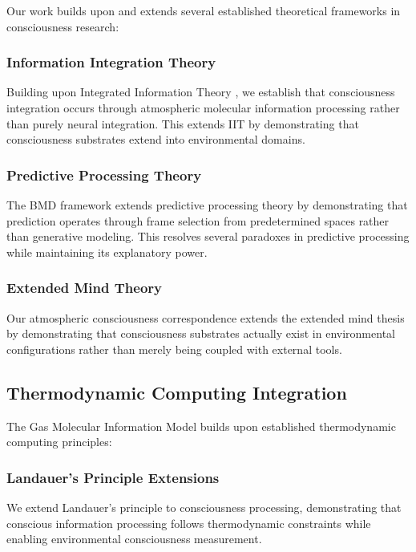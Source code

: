 \documentclass[12pt,a4paper]{article}
\begin{document}
Our work builds upon and extends several established theoretical frameworks in consciousness research:

\subsubsection{Information Integration Theory}

Building upon Integrated Information Theory \citep{tononi2008consciousness}, we establish that consciousness integration occurs through atmospheric molecular information processing rather than purely neural integration. This extends IIT by demonstrating that consciousness substrates extend into environmental domains.

\subsubsection{Predictive Processing Theory}

The BMD framework extends predictive processing theory \citep{clark2013whatever, hohwy2013predictive} by demonstrating that prediction operates through frame selection from predetermined spaces rather than generative modeling. This resolves several paradoxes in predictive processing while maintaining its explanatory power.

\subsubsection{Extended Mind Theory}

Our atmospheric consciousness correspondence extends the extended mind thesis \citep{clark2008supersizing} by demonstrating that consciousness substrates actually exist in environmental configurations rather than merely being coupled with external tools.

\subsection{Thermodynamic Computing Integration}

The Gas Molecular Information Model builds upon established thermodynamic computing principles:

\subsubsection{Landauer's Principle Extensions}

We extend Landauer's principle \citep{landauer1961irreversibility} to consciousness processing, demonstrating that conscious information processing follows thermodynamic constraints while enabling environmental consciousness measurement.
\end{document}
